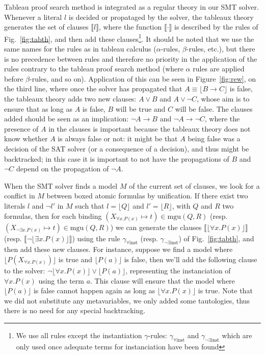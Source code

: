 Tableau proof search method is integrated as a regular theory in our SMT solver.
Whenever a literal $l$ is decided or propataged by the solver, the tableaux theory generates
the set of clauses $\llbracket{}l\rrbracket$, where the function $\llbracket\cdot\rrbracket$ is
described by the rules of Fig.~\ref{fig:tabth}, and then add these clauses\footnote{We use all rules
except the instantiation $\gamma$-rules: $\gamma_{\forall\mathrm{inst}}$ and
$\gamma_{\neg\exists\mathrm{inst}}$ which are only used once adequate terms for instanciation have been found}.
It should be noted that we use the same
names for the rules as in tableau calculus ($\alpha$-rules, $\beta$-rules,
etc.), but there is no precedence between rules and therefore no priority in the
application of the rules contrary to the tableau proof search method (where
$\alpha$ rules are applied before $\beta$-rules, and so on).
Application of this can be seen in Figure~\ref{fig:rew}, on the third line,
where once the solver has propagated that $A \equiv \lfloor B \rightarrow C \rfloor$ is false,
the tableaux theory adds two new clauses: $A \lor B$ and $A \lor \neg C$,
whose aim is to ensure that as long as $A$ is false, $B$ will be true and $C$ will be false.
The clauses added should be seen as an implication: $\neg A \rightarrow B$ and
$\neg A \rightarrow \neg C$, where the presence of $A$ in the clauses is important because
the tableaux theory does not know whether $A$ is always false or not: it might be
that $A$ being false was a decision of the SAT solver (or a consequence of a decision),
and thus might be backtracked; in this case it is important to not have the propagations
of $B$ and $\neg C$ depend on the propagation of $\neg A$.


When the SMT solver finds a model $M$ of the current set of clauses,
we look for a conflict in $M$ between boxed atomic formulas by unification.
If there exist two literals $l$ and $\neg{}l'$ in $M$ such that $l=\lfloor{}Q\rfloor$ and
$l'=\lfloor{}R\rfloor$, with $Q$ and $R$ two formulas, then for each binding
$(X_{\forall{}x.P(x)}\mapsto{}t)\in\mathrm{mgu}(Q,R)$ (resp.
$(X_{\neg\exists{}x.P(x)}\mapsto{}t)\in\mathrm{mgu}(Q,R)$)
we can generate the clauses $\llbracket\lfloor\forall{}x.P(x)\rfloor{}\rrbracket$
(resp. $\llbracket\neg\lfloor\exists{}x.P(x)\rfloor{}\rrbracket$) using the rule
$\gamma_{\forall\mathrm{inst}}$ (resp. $\gamma_{\neg\exists\mathrm{inst}}$) of
Fig.~\ref{fig:tabth}, and then add these new clauses. For instance, suppose we find a model where $\lfloor P(X_{\forall x. P(x)}) \rfloor$
is true and $\lfloor P(a) \rfloor$ is false, then we'll add the following clause to the solver: $\neg \lfloor \forall x. P(x) \rfloor \lor \lfloor P(a) \rfloor$, representing
the instanciation of $\forall x. P(x)$ using the term $a$. This clause will ensure that
the model where $\lfloor P(a) \rfloor$ is false cannot happen again as long as
$\lfloor \forall x. P(x) \rfloor$ is true. Note that we did not substitute any metavariables,
we only added some tautologies, thus there is no need for any special backtracking.

